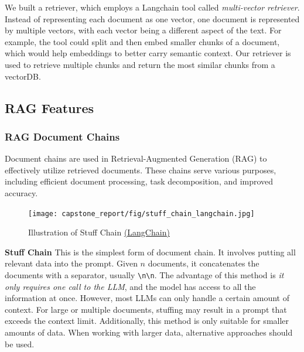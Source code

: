 \documentclass{scrartcl}
\begin{document}
We built a retriever, which employs a Langchain tool called \textit{multi-vector retriever}.
Instead of representing each document as one vector, one document is represented by multiple vectors, with each vector being a different aspect of the text.
For example, the tool could split and then embed smaller chunks of a document, which would help embeddings to better carry semantic context.
Our retriever is used to retrieve multiple chunks and return the most similar chunks from a vectorDB.

\subsection{RAG Features}

\subsubsection{RAG Document Chains}

Document chains are used in Retrieval-Augmented Generation (RAG) to effectively utilize retrieved documents. These chains serve various purposes, including efficient document processing, task decomposition, and improved accuracy.
\newline
\newline

\begin{figure}[H]
    \centering
    \texttt{[image: capstone\_report/fig/stuff\_chain\_langchain.jpg]}
    \caption{Illustration of Stuff Chain \href{https://readmedium.com/en/https:/ogre51.medium.com/types-of-chains-in-langchain-823c8878c2e9}{(LangChain)}}

\end{figure}
\newline
\textbf{Stuff Chain}
\newline
\newline
This is the simplest form of document chain. It involves putting all relevant data into the prompt. Given \(n\) documents, it concatenates the documents with a separator, usually \verb|\n\n|.
The advantage of this method is \textit{it only requires one call to the LLM}, and the model has access to all the information at once.
\newline
\newline
However, most LLMs can only handle a certain amount of context. For large or multiple documents, stuffing may result in a prompt that exceeds the context limit.
Additionally, this method is only suitable for smaller amounts of data. When working with larger data, alternative approaches should be used.
\end{document}
